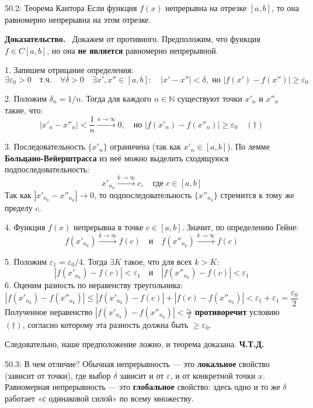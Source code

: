 \documentclass[a4paper,12pt]{article}
\newcommand{\myproof}{\textbf{Доказательство.}\ }
\begin{document}
	\begin{theorembox}{50.2: Теорема Кантора}
		Если функция $f(x)$ непрерывна на отрезке $[a, b]$, то она равномерно непрерывна на этом отрезке.
	\end{theorembox}
	
	\vspace{0.5cm}
	\myproof
	Докажем от противного. Предположим, что функция $f \in C[a, b]$, но она \textbf{не является} равномерно непрерывной.
	
	1. Запишем отрицание определения:
	$$ \exists \varepsilon_0 > 0 \quad \text{т.ч.} \quad \forall \delta > 0 \quad \exists x', x'' \in [a, b]: \quad |x' - x''| < \delta, \text{ но } |f(x') - f(x'')| \geq \varepsilon_0 $$
	
	2. Положим $\delta_n = 1/n$. Тогда для каждого $n \in \mathbb{N}$ существуют точки $x'_n$ и $x''_n$ такие, что:
	$$ |x'_n - x''_n| < \frac{1}{n} \xrightarrow{n \to \infty} 0, \quad \text{но } |f(x'_n) - f(x''_n)| \geq \varepsilon_0 \quad (\dagger) $$
	
	3. Последовательность $\{x'_n\}$ ограничена (так как $x'_n \in [a, b]$). По лемме \textbf{Больцано-Вейерштрасса} из неё можно выделить сходящуюся подпоследовательность:
	$$ x'_{n_k} \xrightarrow{k \to \infty} c, \quad \text{где } c \in [a, b] $$
	Так как $|x'_{n_k} - x''_{n_k}| \to 0$, то подпоследовательность $\{x''_{n_k}\}$ стремится к тому же пределу $c$.
	
	4. Функция $f(x)$ непрерывна в точке $c \in [a, b]$. Значит, по определению Гейне:
	$$ f(x'_{n_k}) \xrightarrow{k \to \infty} f(c) \quad \text{и} \quad f(x''_{n_k}) \xrightarrow{k \to \infty} f(c) $$
	
	5. Положим $\varepsilon_1 = \varepsilon_0/4$. Тогда $\exists K$ такое, что для всех $k > K$:
	$$ |f(x'_{n_k}) - f(c)| < \varepsilon_1 \quad \text{и} \quad |f(x''_{n_k}) - f(c)| < \varepsilon_1 $$
	6. Оценим разность по неравенству треугольника:
	$$ |f(x'_{n_k}) - f(x''_{n_k})| \leq |f(x'_{n_k}) - f(c)| + |f(c) - f(x''_{n_k})| < \varepsilon_1 + \varepsilon_1 = \frac{\varepsilon_0}{2} $$
	Полученное неравенство $|f(x'_{n_k}) - f(x''_{n_k})| < \frac{\varepsilon_0}{2}$ \textbf{противоречит} условию $(\dagger)$, согласно которому эта разность должна быть $\geq \varepsilon_0$.
	
	Следовательно, наше предположение ложно, и теорема доказана. \textbf{Ч.Т.Д.}
	
	
	\begin{notebook}{50.3: В чем отличие?}
		Обычная непрерывность — это \textbf{локальное} свойство (зависит от точки), где выбор $\delta$ зависит и от $\varepsilon$, и от конкретной точки $x$. Равномерная непрерывность — это \textbf{глобальное} свойство: здесь одно и то же $\delta$ работает «с одинаковой силой» по всему множеству.
	\end{notebook}
	
\end{document}
